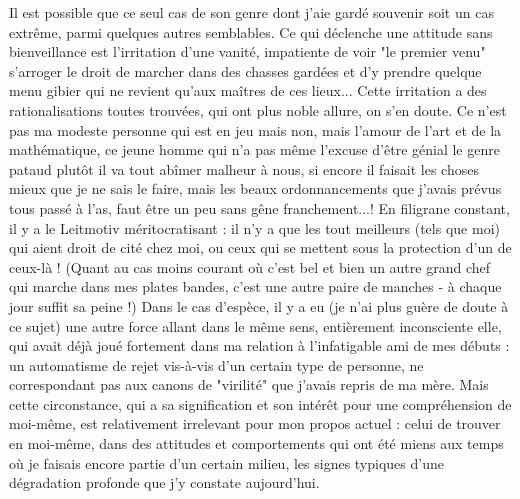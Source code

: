 Il est possible que ce seul cas de son genre dont j'aie gardé souvenir soit un cas extrême, parmi quelques autres semblables. Ce qui déclenche une attitude sans bienveillance est l'irritation d'une vanité, impatiente de voir "le premier venu" s'arroger le droit de marcher dans des chasses gardées et d'y prendre quelque menu gibier qui ne revient qu'aux maîtres de ces lieux... Cette irritation a des rationalisations toutes trouvées, qui ont plus noble allure, on s'en doute. Ce n'est pas ma modeste personne qui est en jeu mais non, mais l'amour de l'art et de la mathématique, ce jeune homme qui n'a pas même l'excuse d'être génial le genre pataud plutôt il va tout abîmer malheur à nous, si encore il faisait les choses mieux que je ne sais le faire, mais les beaux ordonnancements que j'avais prévus tous passé à l'as, faut être un peu sans gêne franchement...! En filigrane constant, il y a le Leitmotiv méritocratisant : il n'y a que les tout meilleurs (tels que moi) qui aient droit de cité chez moi, ou ceux qui se mettent sous la protection d'un de ceux-là ! (Quant au cas moins courant où c'est bel et bien un autre grand chef qui marche dans mes plates bandes, c'est une autre paire de manches - à chaque jour suffit sa peine !) Dans le cas d'espèce, il y a eu (je n'ai plus guère de doute à ce sujet) une autre force allant dans le même sens, entièrement inconsciente elle, qui avait déjà joué fortement dans ma relation à l'infatigable ami de mes débuts : un automatisme de rejet vis-à-vis d'un certain type de personne, ne correspondant pas aux canons de "virilité" que j'avais repris de ma mère. Mais cette circonstance, qui a sa signification et son intérêt pour une compréhension de moi-même, est relativement irrelevant pour mon propos actuel : celui de trouver en moi-même, dans des attitudes et comportements qui ont été miens aux temps où je faisais encore partie d'un certain milieu, les signes typiques d'une dégradation profonde que j'y constate aujourd'hui.

